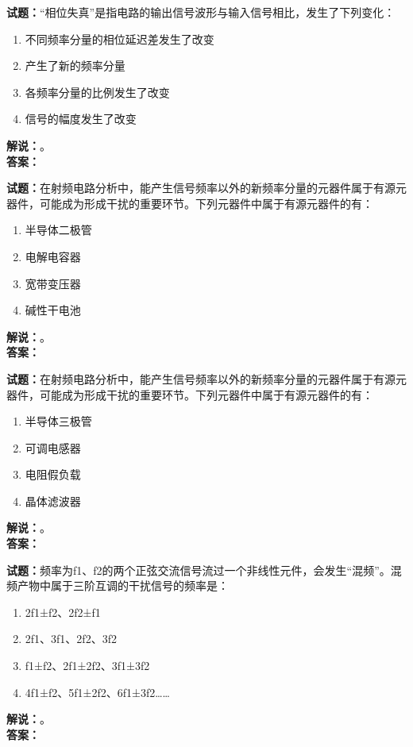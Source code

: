 \documentclass{ctexbook}
\begin{document}
\bigskip




\noindent\textbf{试题：}“相位失真”是指电路的输出信号波形与输入信号相比，发生了下列变化：
\begin{enumerate}[leftmargin=3em]
\item 不同频率分量的相位延迟差发生了改变
\item 产生了新的频率分量
\item 各频率分量的比例发生了改变
\item 信号的幅度发生了改变
\end{enumerate}
\noindent\textbf{解说：}\textbf{}。\\\noindent\textbf{答案：}

\bigskip




\noindent\textbf{试题：}在射频电路分析中，能产生信号频率以外的新频率分量的元器件属于有源元器件，可能成为形成干扰的重要环节。下列元器件中属于有源元器件的有：
\begin{enumerate}[leftmargin=3em]
\item 半导体二极管
\item 电解电容器
\item 宽带变压器
\item 碱性干电池
\end{enumerate}
\noindent\textbf{解说：}\textbf{}。\\\noindent\textbf{答案：}

\bigskip




\noindent\textbf{试题：}在射频电路分析中，能产生信号频率以外的新频率分量的元器件属于有源元器件，可能成为形成干扰的重要环节。下列元器件中属于有源元器件的有：
\begin{enumerate}[leftmargin=3em]
\item 半导体三极管
\item 可调电感器
\item 电阻假负载
\item 晶体滤波器
\end{enumerate}
\noindent\textbf{解说：}\textbf{}。\\\noindent\textbf{答案：}

\bigskip




\noindent\textbf{试题：}频率为f1、f2的两个正弦交流信号流过一个非线性元件，会发生“混频”。混频产物中属于三阶互调的干扰信号的频率是：
\begin{enumerate}[leftmargin=3em]
\item 2f1±f2、2f2±f1
\item 2f1、3f1、2f2、3f2
\item f1±f2、2f1±2f2、3f1±3f2
\item 4f1±f2、5f1±2f2、6f1±3f2……
\end{enumerate}
\noindent\textbf{解说：}\textbf{}。\\\noindent\textbf{答案：}
\end{document}
